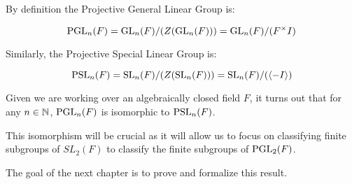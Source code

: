 By definition the Projective General Linear Group is:

\begin{equation}
    \operatorname{PGL}_n(F) = \operatorname{GL}_n(F) / (Z(\operatorname{GL}_n(F))) = \operatorname{GL}_n(F) / (F^\times I) 
\end{equation}

Similarly, the Projective Special Linear Group is:

\begin{equation}
    \operatorname{PSL}_n(F) = \operatorname{SL}_n(F) / (Z(\operatorname{SL}_n(F))) = \operatorname{SL}_n(F) / (\langle -I\rangle)
\end{equation}

Given we are working over an algebraically closed field $F$, it turns out that for any $n \in \mathbb{N}$, $\operatorname{PGL}_n(F)$ is isomorphic to $\operatorname{PSL}_n(F)$.

This isomorphism will be crucial as it will allow us to focus on classifying finite subgroups of $SL_2(F)$ to classify the finite subgroups of $\operatorname{PGL}_2(F)$.

The goal of the next chapter is to prove and formalize this result.